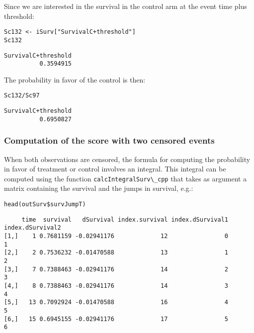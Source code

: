 \documentclass[12pt]{article}
\begin{document}
Since we are interested in the survival in the control arm at the event time plus threshold:
\lstset{language=r,label= ,caption= ,captionpos=b,numbers=none}
\begin{lstlisting}
Sc132 <- iSurv["SurvivalC+threshold"] 
Sc132
\end{lstlisting}

\begin{verbatim}
SurvivalC+threshold 
          0.3594915
\end{verbatim}

The probability in favor of the control is then:
\lstset{language=r,label= ,caption= ,captionpos=b,numbers=none}
\begin{lstlisting}
Sc132/Sc97
\end{lstlisting}

\begin{verbatim}
SurvivalC+threshold 
          0.6950827
\end{verbatim}

\subsubsection{Computation of the score with two censored events}
\label{sec:orgd158cc2}

When both observations are censored, the formula for computing the
probability in favor of treatment or control involves an
integral. This integral can be computed using the function
\texttt{calcIntegralSurv\textbackslash{}\_cpp} that takes as argument a matrix containing the
survival and the jumps in survival, e.g.:
\lstset{language=r,label= ,caption= ,captionpos=b,numbers=none}
\begin{lstlisting}
head(outSurv$survJumpT)
\end{lstlisting}

\begin{verbatim}
     time  survival   dSurvival index.survival index.dSurvival1 index.dSurvival2
[1,]    1 0.7681159 -0.02941176             12                0                1
[2,]    2 0.7536232 -0.01470588             13                1                2
[3,]    7 0.7388463 -0.02941176             14                2                3
[4,]    8 0.7388463 -0.02941176             14                3                4
[5,]   13 0.7092924 -0.01470588             16                4                5
[6,]   15 0.6945155 -0.02941176             17                5                6
\end{verbatim}
\end{document}
